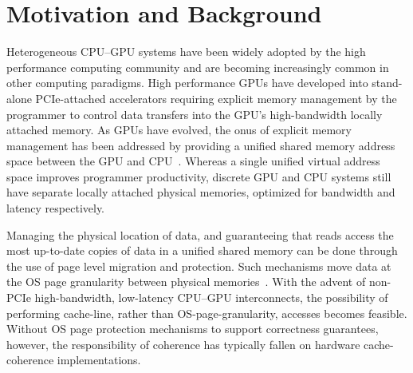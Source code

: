 \vspace{-.05in}
\section{Motivation and Background}
\label{background}

Heterogeneous CPU--GPU systems have been widely
adopted by the high performance computing community 
and are becoming increasingly common in other computing paradigms.  High performance GPUs have 
developed into stand-alone PCIe-attached accelerators requiring explicit memory 
management by the programmer to control data transfers into the GPU's 
high-bandwidth locally attached memory. As GPUs have evolved, the onus of 
explicit memory management has been addressed by providing a unified shared
memory address space between the GPU and CPU~\cite{UVM,HSA}.  Whereas a single 
unified virtual address space improves programmer productivity, discrete GPU and 
CPU systems still have separate locally attached physical memories, optimized for 
bandwidth and latency respectively. 

Managing the physical location of data, and guaranteeing that reads access 
the most up-to-date copies of 
data in a unified shared memory can be done through the use of page level 
migration and protection. Such mechanisms move data at the OS page granularity between 
physical memories~\cite{UVM}.  With the advent of non-PCIe high-bandwidth, low-latency
CPU--GPU interconnects, the possibility of performing cache-line, rather than OS-page-granularity, accesses
becomes feasible.  Without OS page protection
mechanisms to support correctness guarantees, however,  the responsibility of coherence
has typically fallen on hardware cache-coherence implementations.


